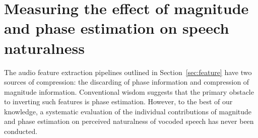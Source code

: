 \documentclass[a4paper]{article}
\begin{document}

\section{Measuring the effect of magnitude and phase estimation on speech naturalness}
\label{sec:magphs}

The audio feature extraction pipelines outlined in Section~\ref{sec:feature} have two sources of compression: the discarding of phase information and compression of magnitude information. 
Conventional wisdom suggests that the primary obstacle to inverting such features is phase estimation. 
However, 
to the best of our knowledge, 
a systematic evaluation of the individual contributions of magnitude and phase estimation on perceived naturalness of vocoded speech has never been conducted.
\end{document}
